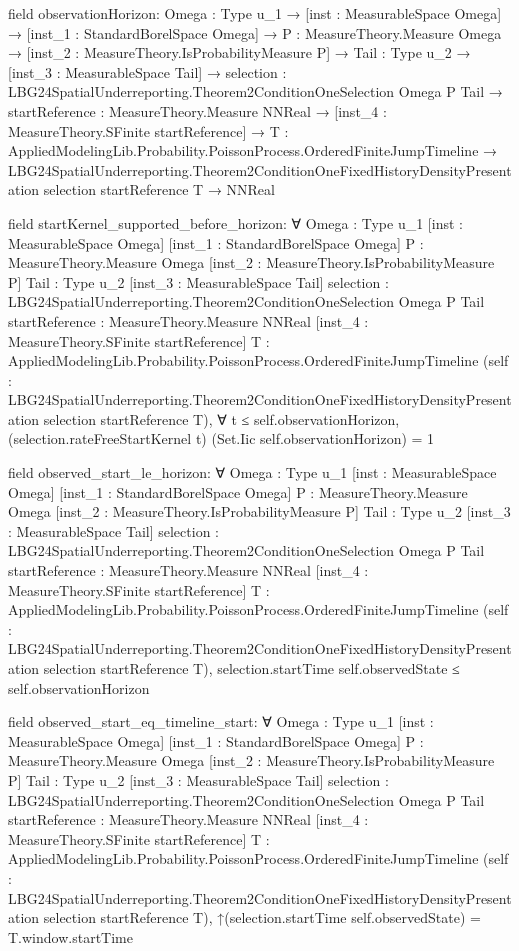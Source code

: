 \documentclass[10pt]{article}
\begin{document}
\begin{ReviewVerbatim}
field observationHorizon:
{Omega : Type u_1} →
  [inst : MeasurableSpace Omega] →
    [inst_1 : StandardBorelSpace Omega] →
      {P : MeasureTheory.Measure Omega} →
        [inst_2 : MeasureTheory.IsProbabilityMeasure P] →
          {Tail : Type u_2} →
            [inst_3 : MeasurableSpace Tail] →
              {selection : LBG24SpatialUnderreporting.Theorem2ConditionOneSelection Omega P Tail} →
                {startReference : MeasureTheory.Measure NNReal} →
                  [inst_4 : MeasureTheory.SFinite startReference] →
                    {T : AppliedModelingLib.Probability.PoissonProcess.OrderedFiniteJumpTimeline} →
                      LBG24SpatialUnderreporting.Theorem2ConditionOneFixedHistoryDensityPresentation selection
                          startReference T →
                        NNReal

field startKernel_supported_before_horizon:
∀ {Omega : Type u_1} [inst : MeasurableSpace Omega] [inst_1 : StandardBorelSpace Omega]
  {P : MeasureTheory.Measure Omega} [inst_2 : MeasureTheory.IsProbabilityMeasure P] {Tail : Type u_2}
  [inst_3 : MeasurableSpace Tail] {selection : LBG24SpatialUnderreporting.Theorem2ConditionOneSelection Omega P Tail}
  {startReference : MeasureTheory.Measure NNReal} [inst_4 : MeasureTheory.SFinite startReference]
  {T : AppliedModelingLib.Probability.PoissonProcess.OrderedFiniteJumpTimeline}
  (self : LBG24SpatialUnderreporting.Theorem2ConditionOneFixedHistoryDensityPresentation selection startReference T),
  ∀ t ≤ self.observationHorizon, (selection.rateFreeStartKernel t) (Set.Iic self.observationHorizon) = 1

field observed_start_le_horizon:
∀ {Omega : Type u_1} [inst : MeasurableSpace Omega] [inst_1 : StandardBorelSpace Omega]
  {P : MeasureTheory.Measure Omega} [inst_2 : MeasureTheory.IsProbabilityMeasure P] {Tail : Type u_2}
  [inst_3 : MeasurableSpace Tail] {selection : LBG24SpatialUnderreporting.Theorem2ConditionOneSelection Omega P Tail}
  {startReference : MeasureTheory.Measure NNReal} [inst_4 : MeasureTheory.SFinite startReference]
  {T : AppliedModelingLib.Probability.PoissonProcess.OrderedFiniteJumpTimeline}
  (self : LBG24SpatialUnderreporting.Theorem2ConditionOneFixedHistoryDensityPresentation selection startReference T),
  selection.startTime self.observedState ≤ self.observationHorizon

field observed_start_eq_timeline_start:
∀ {Omega : Type u_1} [inst : MeasurableSpace Omega] [inst_1 : StandardBorelSpace Omega]
  {P : MeasureTheory.Measure Omega} [inst_2 : MeasureTheory.IsProbabilityMeasure P] {Tail : Type u_2}
  [inst_3 : MeasurableSpace Tail] {selection : LBG24SpatialUnderreporting.Theorem2ConditionOneSelection Omega P Tail}
  {startReference : MeasureTheory.Measure NNReal} [inst_4 : MeasureTheory.SFinite startReference]
  {T : AppliedModelingLib.Probability.PoissonProcess.OrderedFiniteJumpTimeline}
  (self : LBG24SpatialUnderreporting.Theorem2ConditionOneFixedHistoryDensityPresentation selection startReference T),
  ↑(selection.startTime self.observedState) = T.window.startTime


\end{ReviewVerbatim}
\end{document}
